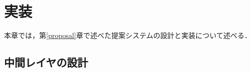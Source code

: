 \chapter{実装}
\label{implementation}
本章では，第\ref{proposal}章で述べた提案システムの設計と実装について述べる．

\section{中間レイヤの設計}





